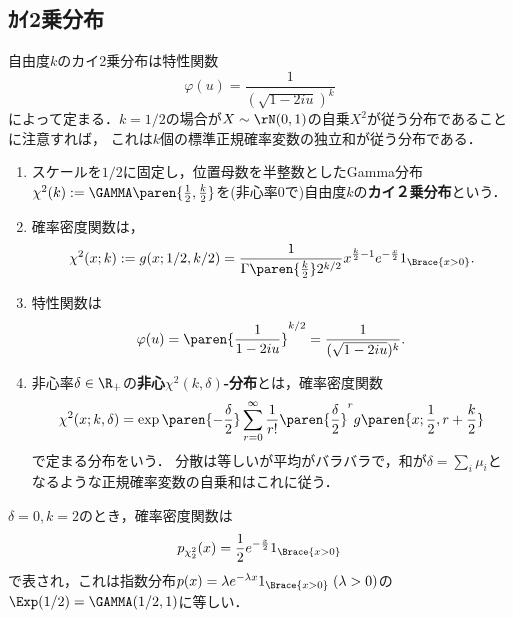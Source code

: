 \documentclass[uplatex,dvipdfmx]{jsreport}
\begin{document}
\subsection{ｶｲ2乗分布}

\begin{tcolorbox}[colframe=ForestGreen, colback=ForestGreen!10!white,breakable,colbacktitle=ForestGreen!40!white,coltitle=black,fonttitle=\bfseries\sffamily,
title=]
    自由度$k$のカイ2乗分布は特性関数
    \[\varphi(u)=\frac{1}{(\sqrt{1-2iu})^k}\]
    によって定まる．$k=1/2$の場合が$X\sim\rN(0,1)$の自乗$X^2$が従う分布であることに注意すれば，
    これは$k$個の標準正規確率変数の独立和が従う分布である．
\end{tcolorbox}

\begin{definition}\mbox{}
    \begin{enumerate}
        \item スケールを$1/2$に固定し，位置母数を半整数としたGamma分布$\chi^2(k):=\GAMMA\paren{\frac{1}{2},\frac{k}{2}}$を(非心率$0$で)自由度$k$の\textbf{カイ２乗分布}という．
        \item 確率密度関数は，
        \[\chi^2(x;k):=g(x;1/2,k/2)=\frac{1}{\Gamma\paren{\frac{k}{2}}2^{k/2}}x^{\frac{k}{2}-1}e^{-\frac{x}{2}}1_{\Brace{x>0}}.\]
        \item 特性関数は
        \[\varphi(u)=\paren{\frac{1}{1-2iu}}^{k/2}=\frac{1}{(\sqrt{1-2iu})^k}.\]
        \item 非心率$\delta\in\R_+$の\textbf{非心$\chi^2(k,\delta)$-分布}とは，確率密度関数
        \[\chi^2(x;k,\delta)=\exp\paren{-\frac{\delta}{2}}\sum_{r=0}^\infty\frac{1}{r!}\paren{\frac{\delta}{2}}^rg\paren{x;\frac{1}{2},r+\frac{k}{2}}\]
        で定まる分布をいう．
        分散は等しいが平均がバラバラで，和が$\delta=\sum_{i}\mu_i$となるような正規確率変数の自乗和はこれに従う．
    \end{enumerate}
\end{definition}
\begin{remarks}
    $\delta=0,k=2$のとき，確率密度関数は
    \[p_{\chi_2^2}(x)=\frac{1}{2}e^{-\frac{x}{2}}1_{\Brace{x>0}}\]
    で表され，これは指数分布$p(x)=\lambda e^{-\lambda x}1_{\Brace{x>0}}\;(\lambda>0)$の$\Exp(1/2)=\GAMMA(1/2,1)$に等しい．
\end{remarks}
\end{document}
